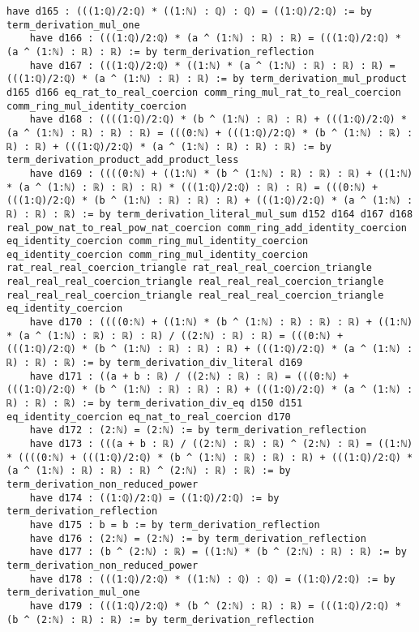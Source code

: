 \documentclass{article}
\begin{document}
\begin{tcolorbox}[colback=white!10, width=\linewidth]
\begin{lstlisting}[language=Lean4]
    have d165 : (((1:ℚ)/2:ℚ) * ((1:ℕ) : ℚ) : ℚ) = ((1:ℚ)/2:ℚ) := by term_derivation_mul_one
    have d166 : (((1:ℚ)/2:ℚ) * (a ^ (1:ℕ) : ℝ) : ℝ) = (((1:ℚ)/2:ℚ) * (a ^ (1:ℕ) : ℝ) : ℝ) := by term_derivation_reflection
    have d167 : (((1:ℚ)/2:ℚ) * ((1:ℕ) * (a ^ (1:ℕ) : ℝ) : ℝ) : ℝ) = (((1:ℚ)/2:ℚ) * (a ^ (1:ℕ) : ℝ) : ℝ) := by term_derivation_mul_product d165 d166 eq_rat_to_real_coercion comm_ring_mul_rat_to_real_coercion comm_ring_mul_identity_coercion
    have d168 : ((((1:ℚ)/2:ℚ) * (b ^ (1:ℕ) : ℝ) : ℝ) + (((1:ℚ)/2:ℚ) * (a ^ (1:ℕ) : ℝ) : ℝ) : ℝ) = (((0:ℕ) + (((1:ℚ)/2:ℚ) * (b ^ (1:ℕ) : ℝ) : ℝ) : ℝ) + (((1:ℚ)/2:ℚ) * (a ^ (1:ℕ) : ℝ) : ℝ) : ℝ) := by term_derivation_product_add_product_less
    have d169 : ((((0:ℕ) + ((1:ℕ) * (b ^ (1:ℕ) : ℝ) : ℝ) : ℝ) + ((1:ℕ) * (a ^ (1:ℕ) : ℝ) : ℝ) : ℝ) * (((1:ℚ)/2:ℚ) : ℝ) : ℝ) = (((0:ℕ) + (((1:ℚ)/2:ℚ) * (b ^ (1:ℕ) : ℝ) : ℝ) : ℝ) + (((1:ℚ)/2:ℚ) * (a ^ (1:ℕ) : ℝ) : ℝ) : ℝ) := by term_derivation_literal_mul_sum d152 d164 d167 d168 real_pow_nat_to_real_pow_nat_coercion comm_ring_add_identity_coercion eq_identity_coercion comm_ring_mul_identity_coercion eq_identity_coercion comm_ring_mul_identity_coercion rat_real_real_coercion_triangle rat_real_real_coercion_triangle real_real_real_coercion_triangle real_real_real_coercion_triangle real_real_real_coercion_triangle real_real_real_coercion_triangle eq_identity_coercion
    have d170 : ((((0:ℕ) + ((1:ℕ) * (b ^ (1:ℕ) : ℝ) : ℝ) : ℝ) + ((1:ℕ) * (a ^ (1:ℕ) : ℝ) : ℝ) : ℝ) / ((2:ℕ) : ℝ) : ℝ) = (((0:ℕ) + (((1:ℚ)/2:ℚ) * (b ^ (1:ℕ) : ℝ) : ℝ) : ℝ) + (((1:ℚ)/2:ℚ) * (a ^ (1:ℕ) : ℝ) : ℝ) : ℝ) := by term_derivation_div_literal d169
    have d171 : ((a + b : ℝ) / ((2:ℕ) : ℝ) : ℝ) = (((0:ℕ) + (((1:ℚ)/2:ℚ) * (b ^ (1:ℕ) : ℝ) : ℝ) : ℝ) + (((1:ℚ)/2:ℚ) * (a ^ (1:ℕ) : ℝ) : ℝ) : ℝ) := by term_derivation_div_eq d150 d151 eq_identity_coercion eq_nat_to_real_coercion d170
    have d172 : (2:ℕ) = (2:ℕ) := by term_derivation_reflection
    have d173 : (((a + b : ℝ) / ((2:ℕ) : ℝ) : ℝ) ^ (2:ℕ) : ℝ) = ((1:ℕ) * ((((0:ℕ) + (((1:ℚ)/2:ℚ) * (b ^ (1:ℕ) : ℝ) : ℝ) : ℝ) + (((1:ℚ)/2:ℚ) * (a ^ (1:ℕ) : ℝ) : ℝ) : ℝ) ^ (2:ℕ) : ℝ) : ℝ) := by term_derivation_non_reduced_power
    have d174 : ((1:ℚ)/2:ℚ) = ((1:ℚ)/2:ℚ) := by term_derivation_reflection
    have d175 : b = b := by term_derivation_reflection
    have d176 : (2:ℕ) = (2:ℕ) := by term_derivation_reflection
    have d177 : (b ^ (2:ℕ) : ℝ) = ((1:ℕ) * (b ^ (2:ℕ) : ℝ) : ℝ) := by term_derivation_non_reduced_power
    have d178 : (((1:ℚ)/2:ℚ) * ((1:ℕ) : ℚ) : ℚ) = ((1:ℚ)/2:ℚ) := by term_derivation_mul_one
    have d179 : (((1:ℚ)/2:ℚ) * (b ^ (2:ℕ) : ℝ) : ℝ) = (((1:ℚ)/2:ℚ) * (b ^ (2:ℕ) : ℝ) : ℝ) := by term_derivation_reflection

\end{lstlisting}
\end{tcolorbox}
\end{document}
